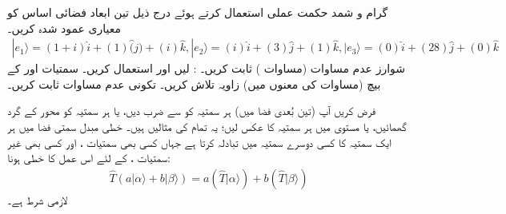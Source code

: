 گرام و شمد حکمت عملی استعمال کرتے ہوئے درج ذیل   تین ابعاد فضائی  اساس کو  معیاری عمود شدہ  کریں۔
\begin{align*}
|e_1\rangle=(1+i)\hat{i}+(1)\hat(j)+(i)\hat{k}, |e_2\rangle=(i)\hat{i}+(3)\hat{j}+(1)\hat{k}, |e_3\rangle=(0)\hat{i}+(28)\hat{j}+(0)\hat{k}
\end{align*}
شوارز عدم مساوات (مساوات )   ثابت کریں۔ :  لیں  اور  استعمال کریں۔
سمتیات  اور  کے بیچ (مساوات  کی معنوں میں)  زاویہ تلاش کریں۔
تکونی عدم مساوات  ثابت کریں۔

فرض کریں آپ  (تین بُعدی  فضا میں)  ہر سمتیہ کو  سے ضرب دیں،  یا ہر سمتیہ کو  محور کے گرد  گھمائیں،  یا  مستوی میں ہر سمتیہ کا عکس لیں؛  یہ تمام   کی مثالیں ہیں۔ خطی مبدل    سمتی فضا میں ہر ایک سمتیہ کا کسی دوسرے سمتیہ  میں تبادلہ کرتا ہے  جہاں کسی بھی سمتیات  ،  اور کسی بھی  غیر سمتیات ،    کے لئے اس عمل کا  خطی ہونا:
\begin{align}
	\hat{T}(a|\alpha\rangle+b|\beta\rangle)=a(\hat{T}|\alpha\rangle)+b(\hat{T}|\beta\rangle)
\end{align}
 لازمی شرط  ہے۔

